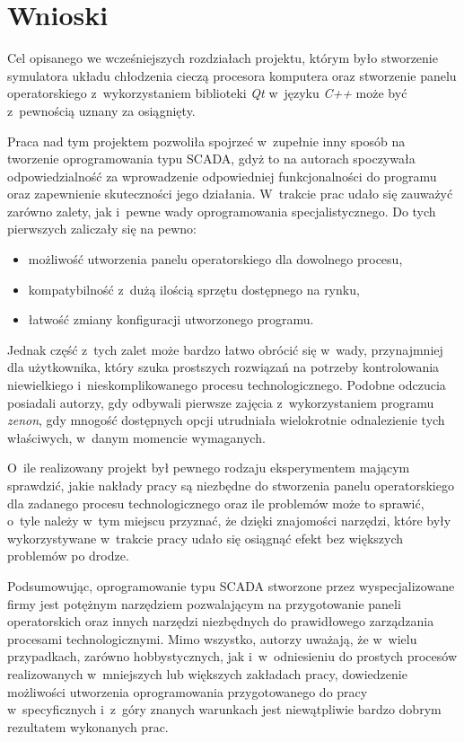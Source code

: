\section{Wnioski}
\indent

Cel opisanego we wcześniejszych rozdziałach projektu, którym było stworzenie
symulatora układu chłodzenia cieczą procesora komputera oraz stworzenie panelu
operatorskiego z~wykorzystaniem biblioteki \textit{Qt} w~języku \textit{C++}
może być z~pewnością uznany za osiągnięty.

Praca nad tym projektem pozwoliła spojrzeć w~zupełnie inny sposób na tworzenie
oprogramowania typu SCADA, gdyż to na autorach spoczywała odpowiedzialność za
wprowadzenie odpowiedniej funkcjonalności do programu oraz zapewnienie
skuteczności jego działania. W~trakcie prac udało się zauważyć zarówno zalety,
jak i~pewne wady oprogramowania specjalistycznego. Do tych pierwszych zaliczały
się na pewno:
\begin{itemize}
    \item możliwość utworzenia panelu operatorskiego dla dowolnego procesu,
    \item kompatybilność z~dużą ilością sprzętu dostępnego na rynku,
    \item łatwość zmiany konfiguracji utworzonego programu.
\end{itemize}
Jednak część z~tych zalet może bardzo łatwo obrócić się w~wady, przynajmniej dla
użytkownika, który szuka prostszych rozwiązań na potrzeby kontrolowania
niewielkiego i~nieskomplikowanego procesu technologicznego. Podobne odczucia
posiadali autorzy, gdy odbywali pierwsze zajęcia z~wykorzystaniem programu
\textit{zenon}, gdy mnogość dostępnych opcji utrudniała wielokrotnie
odnalezienie tych właściwych, w~danym momencie wymaganych.

O~ile realizowany projekt był pewnego rodzaju eksperymentem mającym sprawdzić,
jakie nakłady pracy są niezbędne do stworzenia panelu operatorskiego dla
zadanego procesu technologicznego oraz ile problemów może to sprawić, o~tyle
należy w~tym miejscu przyznać, że dzięki znajomości narzędzi, które były
wykorzystywane w~trakcie pracy udało się osiągnąć efekt bez większych problemów
po drodze.

Podsumowując, oprogramowanie typu SCADA stworzone przez wyspecjalizowane firmy
jest potężnym narzędziem pozwalającym na przygotowanie paneli operatorskich oraz
innych narzędzi niezbędnych do prawidłowego zarządzania procesami
technologicznymi. Mimo wszystko, autorzy uważają, że w~wielu przypadkach,
zarówno hobbystycznych, jak i~w~odniesieniu do prostych procesów realizowanych
w~mniejszych lub większych zakładach pracy, dowiedzenie możliwości utworzenia
oprogramowania przygotowanego do pracy w~specyficznych i~z~góry znanych
warunkach jest niewątpliwie bardzo dobrym rezultatem wykonanych prac.
